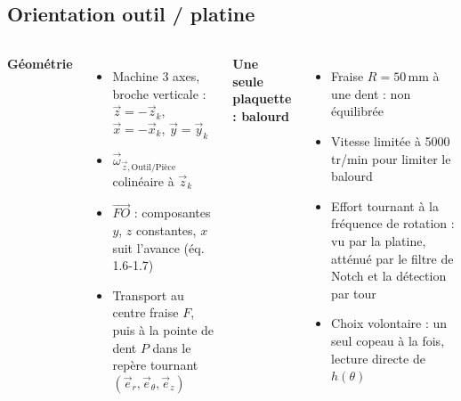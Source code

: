 \subsection*{Orientation outil / platine}
\begin{frame}

    \begin{columns}[t]
        \textbf{Géométrie}
        \begin{itemize}
            \item Machine 3 axes, broche verticale : $\vec{z} = -\vec{z}_k$, $\vec{x} = -\vec{x}_k$, $\vec{y} = \vec{y}_k$
            \item $\vec{\omega}_{\vec{z},\text{Outil/Pièce}}$ colinéaire à $\vec{z}_k$
            \item $\vec{FO}$ : composantes $y$, $z$ constantes, $x$ suit l'avance (éq. 1.6-1.7)
            \item Transport au centre fraise $F$, puis à la pointe de dent $P$ dans le repère tournant $(\vec{e}_r, \vec{e}_\theta, \vec{e}_z)$
        \end{itemize}

        \textbf{Une seule plaquette : balourd}
        \begin{itemize}
            \item Fraise $R = 50$\,mm à une dent : \alert{non équilibrée}
            \item Vitesse limitée à \alert{5000\,tr/min} pour limiter le balourd
            \item Effort tournant à la fréquence de rotation : vu par la platine, atténué par le filtre de Notch et la détection par tour
            \item Choix volontaire : un seul copeau à la fois, lecture directe de $h(\theta)$
        \end{itemize}
    \end{columns}
\end{frame}

